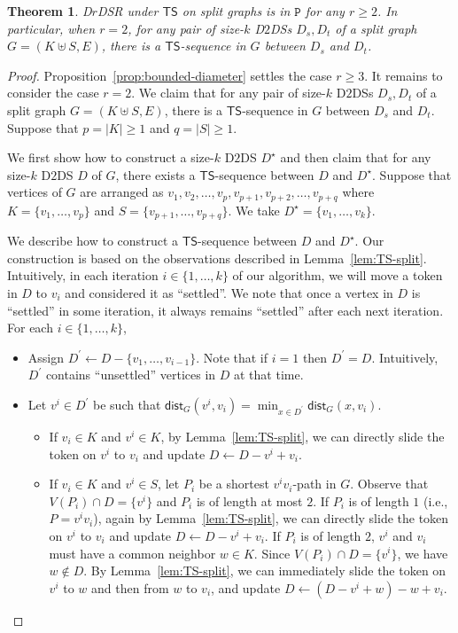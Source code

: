 \documentclass[a4paper]{article}
\theoremstyle{plain}
\newtheorem{theorem}{Theorem}
\theoremstyle{definition}
\newcommand{\sfTS}{{\mathsf{TS}}} %
\newcommand{\ttP}{{\mathtt{P}}}
\newcommand{\dist}{\mathsf{dist}} %
\begin{document}
\begin{theorem}\label{thm:TS-split}
	\textsc{D$r$DSR} under $\sfTS$ on split graphs is in $\ttP$ for any $r \geq 2$.
	In particular, when $r = 2$, for any pair of size-$k$ D$2$DSs $D_s, D_t$ of a split graph $G = (K \uplus S, E)$, there is a $\mathsf{TS}$-sequence in $G$ between $D_s$ and $D_t$.
\end{theorem}
\begin{proof}
	Proposition~\ref{prop:bounded-diameter} settles the case $r \geq 3$.
	It remains to consider the case $r = 2$.
	We claim that for any pair of size-$k$ D$2$DSs $D_s, D_t$ of a split graph $G = (K \uplus S, E)$, there is a $\mathsf{TS}$-sequence in $G$ between $D_s$ and $D_t$.
	Suppose that $p = |K| \geq 1$ and $q = |S| \geq 1$.
	
	We first show how to construct a size-$k$ D$2$DS $D^\star$ and then claim that for any size-$k$ D$2$DS $D$ of $G$, there exists a $\mathsf{TS}$-sequence between $D$ and $D^\star$.
	Suppose that vertices of $G$ are arranged as $v_1, v_2, \dots, v_p, v_{p+1}, v_{p+2}, \dots, v_{p+q}$ where $K = \{v_1, \dots, v_p\}$ and $S = \{v_{p+1}, \dots, v_{p+q}\}$.
	We take $D^\star = \{v_1, \dots, v_k\}$.
	
	We describe how to construct a $\sfTS$-sequence between $D$ and $D^\star$.
	Our construction is based on the observations described in Lemma~\ref{lem:TS-split}.
	Intuitively, in each iteration $i \in \{1, \dots, k\}$ of our algorithm, we will move a token in $D$ to $v_i$ and considered it as ``settled''.
	We note that once a vertex in $D$ is ``settled'' in some iteration, it always remains ``settled'' after each next iteration.
	For each $i \in \{1, \dots, k\}$,
	\begin{itemize}
		\item Assign $D^\prime \gets D - \{v_1, \dots, v_{i-1}\}$. Note that if $i = 1$ then $D^\prime = D$.
		Intuitively, $D^\prime$ contains ``unsettled'' vertices in $D$ at that time. 
		\item Let $v^i \in D^\prime$ be such that $\dist_G(v^i, v_i) = \min_{x \in D^\prime}\dist_G(x, v_i)$.
		\begin{itemize}
			\item If $v_i \in K$ and $v^i \in K$, by Lemma~\ref{lem:TS-split}, we can directly slide the token on $v^i$ to $v_i$ and update $D \gets D - v^i + v_i$.
			
			\item If $v_i \in K$ and $v^i \in S$, let $P_i$ be a shortest $v^iv_i$-path in $G$.
			Observe that $V(P_i) \cap D = \{v^i\}$ and $P_i$ is of length at most $2$.
			If $P_i$ is of length $1$ (i.e., $P = v^iv_i$), again by Lemma~\ref{lem:TS-split}, we can directly slide the token on $v^i$ to $v_i$ and update $D \gets D - v^i + v_i$.
			If $P_i$ is of length $2$, $v^i$ and $v_i$ must have a common neighbor $w \in K$.
			Since $V(P_i) \cap D = \{v^i\}$, we have $w \notin D$.
			By Lemma~\ref{lem:TS-split}, we can immediately slide the token on $v^i$ to $w$ and then from $w$ to $v_i$, and update $D \gets (D - v^i + w) - w + v_i$.
			

\end{itemize}
\end{itemize}
\end{proof}
\end{document}
